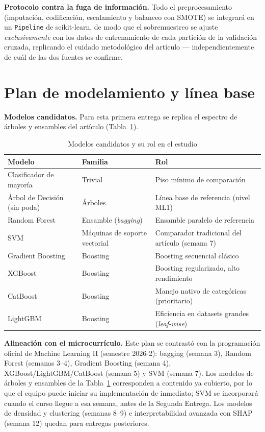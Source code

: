 \documentclass[11pt,a4paper]{article}
\begin{document}
\textbf{Protocolo contra la fuga de información.} Todo el preprocesamiento (imputación, codificación, escalamiento y balanceo con SMOTE) se integrará en un \texttt{Pipeline} de scikit-learn, de modo que el sobremuestreo se ajuste \emph{exclusivamente} con los datos de entrenamiento de cada partición de la validación cruzada, replicando el cuidado metodológico del artículo --- independientemente de cuál de las dos fuentes se confirme.

\section{Plan de modelamiento y línea base}

\textbf{Modelos candidatos.} Para esta primera entrega se replica el espectro de árboles y ensambles del artículo (Tabla~\ref{tab:modelos}).

\begin{table}[h!]
\centering
\footnotesize
\caption{Modelos candidatos y su rol en el estudio}
\label{tab:modelos}
\begin{tabular}{llp{6cm}}
\toprule
Modelo & Familia & Rol \\
\midrule
Clasificador de mayoría & Trivial & Piso mínimo de comparación \\
Árbol de Decisión (sin poda) & Árboles & Línea base de referencia (nivel ML1) \\
Random Forest & Ensamble (\textit{bagging}) & Ensamble paralelo de referencia \\
SVM & Máquinas de soporte vectorial & Comparador tradicional del artículo (semana 7) \\
Gradient Boosting & Boosting & Boosting secuencial clásico \\
XGBoost & Boosting & Boosting regularizado, alto rendimiento \\
CatBoost & Boosting & Manejo nativo de categóricas (prioritario) \\
LightGBM & Boosting & Eficiencia en datasets grandes (\textit{leaf-wise}) \\
\bottomrule
\end{tabular}
\end{table}

\textbf{Alineación con el microcurrículo.} Este plan se contrastó con la programación oficial de Machine Learning II (semestre 2026-2): bagging (semana 3), Random Forest (semanas 3--4), Gradient Boosting (semana 4), XGBoost/LightGBM/CatBoost (semana 5) y SVM (semana 7). Los modelos de árboles y ensambles de la Tabla~\ref{tab:modelos} corresponden a contenido ya cubierto, por lo que el equipo puede iniciar su implementación de inmediato; SVM se incorporará cuando el curso llegue a esa semana, antes de la Segunda Entrega. Los modelos de densidad y clustering (semanas 8--9) e interpretabilidad avanzada con SHAP (semana 12) quedan para entregas posteriores.
\end{document}

